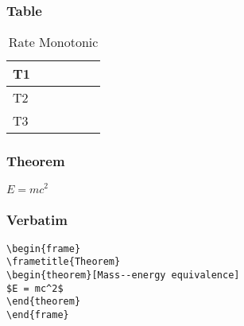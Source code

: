 \documentclass[xcolor=table]{beamer}
\begin{document}
\begin{frame}
\frametitle{Table}
\begin{table}
\centering
\label{RM1}
\begin{tabular}{|l|l|l|l|l|l|}
\hline
T1 & \cellcolor{blue} & \cellcolor{blue} & & & \\ \hline
T2 & & & \cellcolor{red}  & \cellcolor{red} & \\ \hline
T3 & & & & & \cellcolor{green} \\ \hline
\end{tabular}
\caption{Rate Monotonic}
\end{table}
\end{frame}




\begin{frame}
\frametitle{Theorem}
\begin{theorem}
$E = mc^2$
\end{theorem}
\end{frame}


\begin{frame}[fragile] %
\frametitle{Verbatim}
\begin{example}
\begin{verbatim}
\begin{frame}
\frametitle{Theorem}
\begin{theorem}[Mass--energy equivalence]
$E = mc^2$
\end{theorem}
\end{frame}\end{verbatim}
\end{example}
\end{frame}
\end{document}
